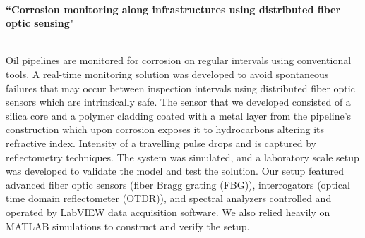 \documentclass[10pt]{article} %
\begin{document}
~~~~

\medskip %


{\raggedright\textbf{``Corrosion monitoring along infrastructures using distributed fiber optic sensing"}}\\
Oil pipelines are monitored for corrosion on regular intervals using conventional tools. A real-time monitoring solution was developed to avoid spontaneous failures that may occur between inspection intervals using distributed fiber optic sensors which are intrinsically safe. The sensor that we developed consisted of a silica core and a polymer cladding coated with a metal layer from the pipeline’s construction which upon corrosion exposes it to hydrocarbons altering its refractive index. Intensity of a travelling pulse drops and is captured by reflectometry techniques. The system was simulated, and a laboratory scale setup was developed to validate the model and test the solution. Our setup featured advanced fiber optic sensors (fiber Bragg grating (FBG)), interrogators (optical time domain reflectometer (OTDR)), and spectral analyzers controlled and operated by LabVIEW data acquisition software. We also relied heavily on MATLAB simulations to construct and verify the setup.

~~~

\medskip %
\end{document}

